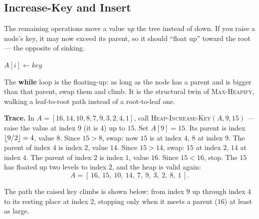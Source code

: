 \subsection{Increase-Key and Insert}

The remaining operations move a value \emph{up} the tree instead of down. If you
raise a node's key, it may now exceed its parent, so it should ``float up''
toward the root --- the opposite of sinking.

\begin{algorithm}[H]
\caption{\textsc{Heap-Increase-Key}$(A, i, \mathit{key})$ --- raise $A[i]$ and float it up}
$A[i] \leftarrow \mathit{key}$\;
\end{algorithm}

The \textbf{while} loop is the floating-up: as long as the node has a parent and
is bigger than that parent, swap them and climb. It is the structural twin of
\textsc{Max-Heapify}, walking a leaf-to-root path instead of a root-to-leaf one.

\textbf{Trace.} In $A=[16,14,10,8,7,9,3,2,4,1]$, call
\textsc{Heap-Increase-Key}$(A, 9, 15)$ --- raise the value at index $9$ (it is
$4$) up to $15$. Set $A[9]=15$. Its parent is index $\lfloor9/2\rfloor=4$, value $8$.
Since $15 > 8$, swap: now $15$ is at index $4$, $8$ at index $9$. The parent of
index $4$ is index $2$, value $14$. Since $15 > 14$, swap: $15$ at index $2$,
$14$ at index $4$. The parent of index $2$ is index $1$, value $16$. Since
$15 < 16$, stop. The $15$ has floated up two levels to index $2$, and the heap is
valid again:
\[
  A = [\,16,\ 15,\ 10,\ 14,\ 7,\ 9,\ 3,\ 2,\ 8,\ 1\,].
\]

The path the raised key climbs is shown below: from index $9$ up through index
$4$ to its resting place at index $2$, stopping only when it meets a parent
($16$) at least as large.

